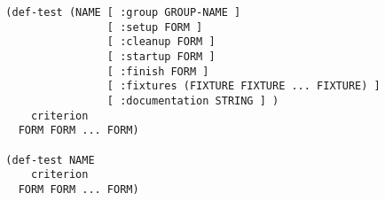 \begin{verbatim}
  (def-test (NAME [ :group GROUP-NAME ]
                  [ :setup FORM ]
                  [ :cleanup FORM ]
                  [ :startup FORM ]
                  [ :finish FORM ]
                  [ :fixtures (FIXTURE FIXTURE ... FIXTURE) ]
                  [ :documentation STRING ] )
      criterion
    FORM FORM ... FORM)

  (def-test NAME
      criterion
    FORM FORM ... FORM)
\end{verbatim}

